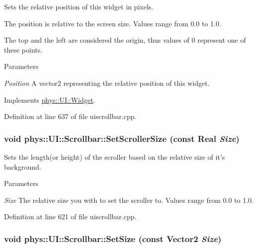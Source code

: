 Sets the relative position of this widget in pixels. 

The position is relative to the screen size. Values range from 0.0 to 1.0. \par
 The top and the left are considered the origin, thus values of 0 represent one of these points. 
\begin{DoxyParams}{Parameters}
\item[{\em Position}]A vector2 representing the relative position of this widget. \end{DoxyParams}


Implements \hyperlink{classphys_1_1UI_1_1Widget_a3f1cd1ce55660c7de4859983bac1ab7c}{phys::UI::Widget}.



Definition at line 637 of file uiscrollbar.cpp.

\hypertarget{classphys_1_1UI_1_1Scrollbar_a7191e819a7d06e5523ebc9d3f253f60a}{
\subsubsection[{SetScrollerSize}]{\setlength{\rightskip}{0pt plus 5cm}void phys::UI::Scrollbar::SetScrollerSize (const {\bf Real} {\em Size})}}
\label{d0/d3e/classphys_1_1UI_1_1Scrollbar_a7191e819a7d06e5523ebc9d3f253f60a}


Sets the length(or height) of the scroller based on the relative size of it's background. 


\begin{DoxyParams}{Parameters}
\item[{\em Size}]The relative size you with to set the scroller to. Values range from 0.0 to 1.0. \end{DoxyParams}


Definition at line 621 of file uiscrollbar.cpp.

\hypertarget{classphys_1_1UI_1_1Scrollbar_af4c4061cf2ddeb783ee52acb805f0cfb}{
\subsubsection[{SetSize}]{\setlength{\rightskip}{0pt plus 5cm}void phys::UI::Scrollbar::SetSize (const {\bf Vector2} {\em Size})}}
\label{d0/d3e/classphys_1_1UI_1_1Scrollbar_af4c4061cf2ddeb783ee52acb805f0cfb}



